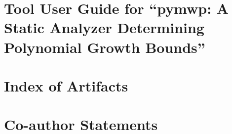 \chapter{Tool User Guide for \enquote{pymwp: A Static Analyzer Determining Polynomial Growth Bounds}}\label{app:toolguide}


\chapter{Index of Artifacts}\label{app:sec:artifacts}


\chapter{Co-author Statements}\label{app:sec:coauth}


\clearpage\pagestyle{plain}
\printglossary[type=\acronymtype,nonumberlist,nopostdot,style=longragged]

\clearpage\printindex

\clearpage\pagestyle{plain}
\printglossary[type=symbols,nopostdot,style=longragged]

